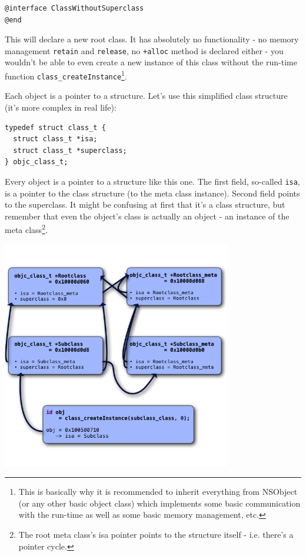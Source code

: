 \documentclass[a4paper, 11pt, fleqn]{book}
\begin{document}
\begin{verbatim}@interface ClassWithoutSuperclass
@end\end{verbatim}

This will declare a new root class. It has absolutely no functionality - no memory management \verb=retain= and \verb=release=, no \verb=+alloc= method is declared either - you wouldn't be able to even create a new instance of this class without the run-time function \verb=class_createInstance=\footnote{This is basically why it is recommended to inherit everything from NSObject (or any other basic object class) which implements some basic communication with the run-time as well as some basic memory management, etc.}.

Each object is a pointer to a structure. Let's use this simplified class structure (it's more complex in real life):

\begin{verbatim}
typedef struct class_t {
  struct class_t *isa;
  struct class_t *superclass;
} objc_class_t;
\end{verbatim}

Every object is a pointer to a structure like this one. The first field, so-called \verb=isa=, is a pointer to the class structure (to the meta class instance). Second field points to the superclass. It might be confusing at first that it's a class structure, but remember that even the object's class is actually an object - an instance of the meta class\footnote{The root meta class's isa pointer points to the structure itself - i.e. there's a pointer cycle.}.

\includegraphics[width=100mm]{metaclass_graph.png}
\end{document}
